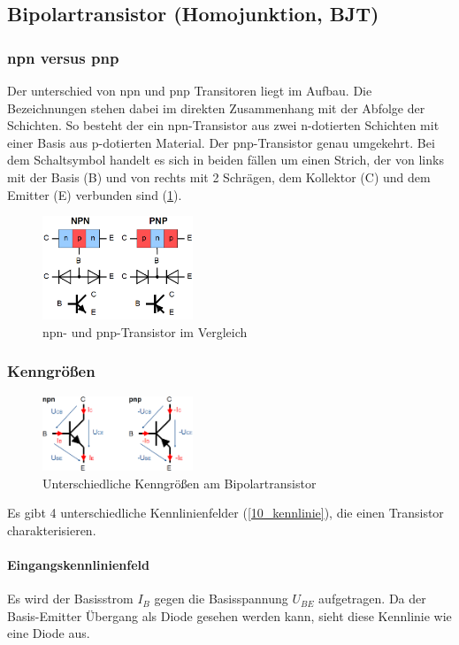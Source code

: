 \subsection{Bipolartransistor (Homojunktion, BJT)}
	\subsubsection{npn versus pnp}
	Der unterschied von npn und pnp Transitoren liegt im Aufbau. Die Bezeichnungen stehen dabei im direkten Zusammenhang mit der Abfolge der Schichten. So besteht der ein npn-Transistor aus zwei n-dotierten Schichten mit einer Basis aus p-dotierten Material. Der pnp-Transistor genau umgekehrt. Bei dem Schaltsymbol handelt es sich in beiden fällen um einen Strich, der von links mit der Basis (B) und von rechts mit 2 Schrägen, dem Kollektor (C) und dem Emitter (E) verbunden sind (\ref{10_npn_pnp}).  
	\begin{figure}[h]
		\centering
		\includegraphics[width=0.4\textwidth]{Kapitel/Kap10/npn_pnp.png}
		\caption{npn- und pnp-Transistor im Vergleich}
		\label{10_npn_pnp}
	\end{figure}

	\subsubsection{Kenngrößen}
	\begin{figure}[h]
		\centering
		\includegraphics[width=0.4\textwidth]{Kapitel/Kap10/groessen.png}
		\caption{Unterschiedliche Kenngrößen am Bipolartransistor}
		\label{10_groessen}
	\end{figure}
	Es gibt 4 unterschiedliche Kennlinienfelder (\ref{10_kennlinie}), die einen Transistor charakterisieren.
	\paragraph{Eingangskennlinienfeld} Es wird der Basisstrom $I_B$ gegen die Basisspannung $U_{BE}$ aufgetragen. Da der Basis-Emitter Übergang als Diode gesehen werden kann, sieht diese Kennlinie wie eine Diode aus.
